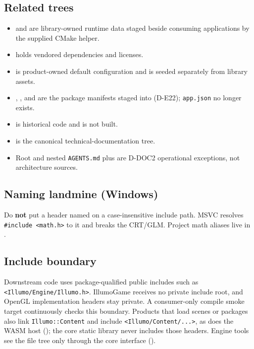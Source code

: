 \subsection{Related trees}
\begin{itemize}
  \item {} and  are library-owned
        runtime data staged beside consuming applications by the supplied CMake helper.
  \item {} holds vendored dependencies and licenses.
  \item {} is product-owned default configuration
        and is seeded separately from library assets.
  \item {}, , and
         are the package manifests staged
        into  (D-E22); \texttt{app.json} no longer exists.
  \item {} is historical code and is not built.
  \item {} is the canonical technical-documentation tree.
  \item Root and nested \texttt{AGENTS.md} plus  are D-DOC2
        operational exceptions, not architecture sources.
\end{itemize}

\subsection{Naming landmine (Windows)}
\begin{decisionbox}[title={Decision: MathTypes.h (2026-07-28)}]
Do \textbf{not} put a header named  on a case-insensitive include
path. MSVC resolves \texttt{\#include <math.h>} to it and breaks the CRT/GLM.
Project math aliases live in .
\end{decisionbox}

\subsection{Include boundary}
Downstream code uses package-qualified public includes such as
\texttt{<Illumo/Engine/Illumo.h>}. IllumoGame receives no private
 include root, and OpenGL implementation headers stay
private. A consumer-only compile smoke target continuously checks this boundary.
Products that load scenes or packages also link \texttt{Illumo::Content} and
include \texttt{<Illumo/Content/...>}, as does the WASM host
(); the core static library never includes those
headers. Engine tools see the file tree only through the core interface
 ().

